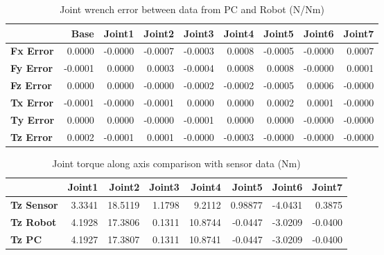 \begin{table}[h!]
	\centering
	\caption{Joint wrench error between data from PC and Robot (N/Nm)}
	\label{wrech_Error_Pose8}
	\begin{tabular}{|l|r|r|r|r|r|r|r|r|}
		\hline
		\textbf{}  & \textbf{Base} & \textbf{Joint1}  & \textbf{Joint2}  & \textbf{Joint3}  & \textbf{Joint4}  & \textbf{Joint5}  & \textbf{Joint6}  & \textbf{Joint7} \\ \hline
		\textbf{Fx Error}  & 0.0000        & -0.0000        & -0.0007        & -0.0003        & 0.0008        & -0.0005        & -0.0000        & 0.0007 \\ \hline
		\textbf{Fy Error}  & -0.0001        & 0.0000        & 0.0003        & -0.0004        & 0.0008        & 0.0008        & -0.0000        & 0.0001 \\ \hline
		\textbf{Fz Error}  & 0.0000        & 0.0000        & -0.0000        & -0.0002        & -0.0002        & -0.0005        & 0.0006        & -0.0000 \\ \hline
		\textbf{Tx Error}  & -0.0001        & -0.0000        & -0.0001        & 0.0000        & 0.0000        & 0.0002        & 0.0001        & -0.0000 \\ \hline
		\textbf{Ty Error}  & 0.0000        & 0.0000        & -0.0000        & -0.0001        & 0.0000        & 0.0000        & -0.0000        & -0.0000 \\ \hline
		\textbf{Tz Error}  & 0.0002        & -0.0001        & 0.0001        & -0.0000        & -0.0003        & -0.0000        & -0.0000        & -0.0000 \\ \hline
	\end{tabular}
\end{table}

\begin{table}[h!]
	\centering
	\caption{Joint torque along axis comparison with sensor data (Nm)}
	\label{wrech_Sensor_Pose8}
	\begin{tabular}{|l|r|r|r|r|r|r|r|}
		\hline
		\textbf{} & \textbf{Joint1} & \textbf{Joint2} & \textbf{Joint3} & \textbf{Joint4} & \textbf{Joint5} & \textbf{Joint6} & \textbf{Joint7} \\ \hline
		\textbf{Tz Sensor}  & 3.3341           & 18.5119           & 1.1798            & 9.2112           & 0.98877           & -4.0431           & 0.3875           \\ \hline
		\textbf{Tz Robot}  	& 4.1928           & 17.3806           & 0.1311            & 10.8744           & -0.0447           & -3.0209           & -0.0400           \\ \hline
		\textbf{Tz PC}  	& 4.1927           & 17.3807           & 0.1311            & 10.8741           & -0.0447           & -3.0209           & -0.0400           \\ \hline
	\end{tabular}
\end{table}

